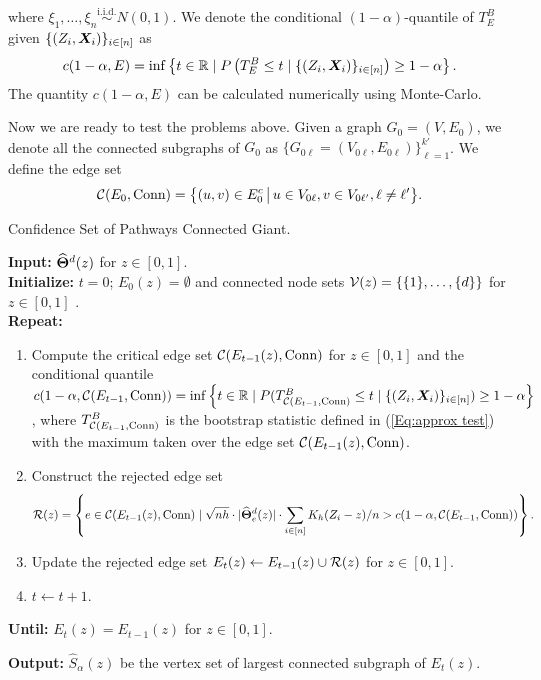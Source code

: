 \documentclass[11pt]{article}
\begin{document}
where  $\xi_1,\ldots,\xi_n \stackrel{\mathrm{i.i.d.}}{\sim} N(0,1)$. 
We denote the conditional $(1-\alpha)$-quantile of $T^B_E$ given $\{(Z_i,\bm{X}_i)\}_{i\in [n]}$ as 
\begin{equation}
\label{Eq:quantile estimate}
c(1-\alpha,E) = \inf \left\{ t\in \mathbb{R}   \; | \;  P \left( T^B_E \le t    \; |\;  \{(Z_i,\bm{X}_i)\}_{i\in[n]} \right) \ge 1-\alpha     \right\}.
\end{equation}
 The quantity $c(1-\alpha,E)$ can be calculated numerically using Monte-Carlo.  


Now we are ready to test the problems above. Given a graph $G_0 = (V, E_0)$, we denote all the connected subgraphs of $G_0$ as $\{G_{0\ell} = (V_{0\ell}, E_{0\ell})\}_{\ell=1}^{k'}$. We define the edge set
\begin{equation}
 \mathcal{C}(E_0, \text{Conn}) = \big\{ (u,v) \in E^c_0 \, \big|\, u \in V_{0\ell}, v \in V_{0 \ell'}, \ell \neq \ell' \big\}.
\end{equation}

\begin{algorithm}[ht]
\caption{\label{al:giant} Confidence Set of Pathways Connected Giant.}
\textbf{Input:} $\widehat{\bm{\Theta}}^d(z)$ for $z\in [0,1]$.  \\
\textbf{Initialize:} $t=0$; $E_0 (z) = \emptyset$ and connected node sets $\mathcal{V}(z) = \{\{1\}, \ldots, \{d\}\}$  for $z\in [0,1]$ .  \\
\textbf{Repeat:} 
\begin{enumerate}
\item Compute the critical edge set $\mathcal{C}(E_{t-1}(z),\text{Conn})$ for $z\in[0,1]$ and the conditional  quantile $c(1-\alpha,\mathcal{C}(E_{t-1},\text{Conn})) =  \inf \left\{ t\in \mathbb{R}   \mid P(T^B_{\mathcal{C}(E_{t-1},\text{Conn})}  \le t \mid \{(Z_i,\bm{X}_i)\}_{i\in[n]})   \ge 1-\alpha     \right\}$,
where 
$T^B_{\mathcal{C}(E_{t-1},\text{Conn})}$ is the bootstrap statistic defined in (\ref{Eq:approx test}) with the maximum taken over the edge set $\mathcal{C}(E_{t-1}(z),\text{Conn})$.

\item Construct the rejected edge set 
\[
\mathcal{R}(z)= \left\{e\in\mathcal{C}(E_{t-1}(z),\text{Conn}) \mid \sqrt{nh} \cdot |\widehat{\bm{\Theta}}_e^d (z)| \cdot \sum_{i\in [n]} K_h(Z_i-z)/n > c (1-\alpha,\mathcal{C}(E_{t-1},\text{Conn})) \right\}.
\]

\item Update the rejected edge set $E_t (z) \gets E_{t-1}(z) \cup \mathcal{R}(z)$ for $z\in [0,1]$.
\item $t \gets t+1$.
\end{enumerate}
\textbf{Until:} $E_t(z)=E_{t-1}(z)$ for $z\in [0,1]$.

\textbf{Output:} $\hat S_{\alpha}(z)$ be the vertex set of largest connected subgraph of $E_t(z)$.
\end{algorithm}
\end{document}
